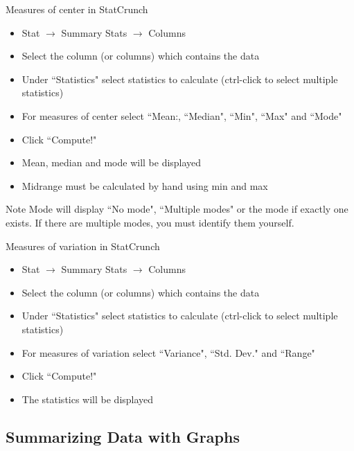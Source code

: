 \documentclass[aspectratio=169]{beamer}
\begin{document}
\begin{frame}{Measures of center in StatCrunch}
\begin{block}{}
\begin{itemize}
\item Stat $\to$ Summary Stats $\to$ Columns
\item Select the column (or columns) which contains the data
\item Under ``Statistics" select statistics to calculate (ctrl-click to select multiple statistics)
\item For measures of center select ``Mean:, ``Median", ``Min", ``Max" and ``Mode"
\item Click ``Compute!"
\item Mean, median and mode will be displayed
\item Midrange must be calculated by hand using min and max
\end{itemize}
\end{block}

\begin{alertblock}{Note}
Mode will display ``No mode", ``Multiple modes" or the mode if exactly one exists. If there are multiple modes, you must identify them yourself.
\end{alertblock}
\end{frame}

\begin{frame}{Measures of variation in StatCrunch}
\begin{block}{}
\begin{itemize}
\item Stat $\to$ Summary Stats $\to$ Columns
\item Select the column (or columns) which contains the data
\item Under ``Statistics" select statistics to calculate (ctrl-click to select multiple statistics)
\item For measures of variation select ``Variance", ``Std. Dev." and ``Range"
\item Click ``Compute!"
\item The statistics will be displayed
\end{itemize}
\end{block}

\end{frame}

%
%
\subsection{Summarizing Data with Graphs}
\end{document}
